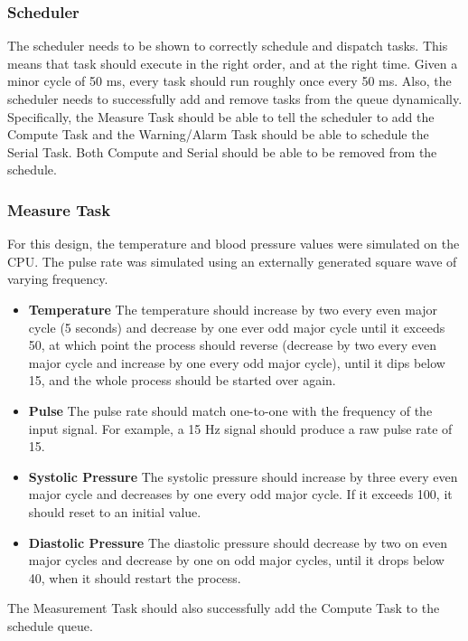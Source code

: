 \documentclass[12pt]{article} %
\begin{document}
    \subsubsection{Scheduler}
    The scheduler needs to be shown to correctly schedule and dispatch tasks.
    This means that task should execute in the right order, and at the right
    time. Given a minor cycle of 50 ms, every task should run roughly once
    every 50 ms.   Also, the scheduler needs to successfully add and remove
    tasks from the queue dynamically.  Specifically, the Measure Task
    should be able to tell the scheduler to add the Compute Task and the
    Warning/Alarm Task should be able to schedule the Serial Task.  Both
    Compute and Serial should be able to be removed from the schedule.

    \subsubsection{Measure Task}
    For this design, the temperature and blood pressure values were simulated
    on the CPU.  The pulse rate was simulated using an externally generated
    square wave of varying frequency.  
    \begin{itemize}
      \item \textbf{Temperature} The temperature should increase by two every
	even major cycle (5 seconds) and decrease by one ever odd major cycle
	until it exceeds 50, at which point the process should reverse
	(decrease by two every even major cycle and increase by one every odd
	major cycle), until it dips below 15, and the whole process should be
	started over again. 
      \item \textbf{Pulse}  The pulse rate should match one-to-one with the
    frequency of the input signal.  For example, a 15 Hz signal should produce
    a raw pulse rate of 15.
      \item \textbf{Systolic Pressure} The systolic pressure should increase by
	three every even major cycle and decreases by one every odd major
	cycle. If it exceeds 100, it should reset to an initial value.
      \item \textbf{Diastolic Pressure} The diastolic pressure should decrease
	by two on even major cycles and decrease by one on odd major cycles,
	until it drops below 40, when it should restart the process.
    \end{itemize}

    The Measurement Task should also successfully add the Compute Task to the 
    schedule queue.
\end{document}

